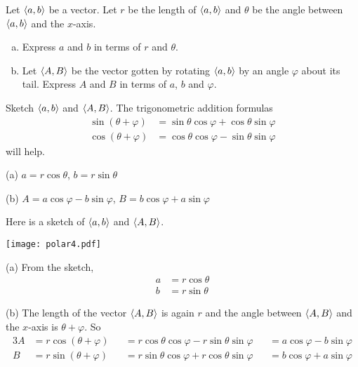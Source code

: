 \begin{question}
Let $\left< a, b\right>$ be a vector. Let $r$ be the length of $\left< a, b\right>$
and $\theta$ be the angle between $\left< a, b\right>$ and the $x$-axis.
\begin{enumerate}[(a)]
\item
Express $a$ and $b$ in terms of $r$ and $\theta$.
\item 
Let $\left< A, B\right>$ be the vector gotten by rotating $\left< a, b\right>$ 
by an angle $\varphi$ about its tail. Express $A$ and $B$ in terms of $a$, 
$b$ and $\varphi$.
\end{enumerate}
\end{question}

\begin{hint}
Sketch $\left< a, b\right>$ and $\left< A, B\right>$.
The trigonometric addition formulas 
\begin{align*}
\sin(\theta+\varphi)
       &=\sin\theta\cos\varphi+\cos\theta\sin\varphi \\
\cos(\theta+\varphi)
       &=\cos\theta\cos\varphi-\sin\theta\sin\varphi
\end{align*}
will help.
\end{hint}

\begin{answer}
(a) $a=r\cos\theta$, $b=r\sin\theta$

(b) $A=a\cos\varphi-b\sin\varphi$, 
    $B=b\cos\varphi+a\sin\varphi$
\end{answer}

\begin{solution}
Here is a sketch of $\left< a, b\right>$ and $\left< A, B\right>$.
\begin{center}
     \texttt{[image: polar4.pdf]}
\end{center}
(a) From the sketch,
\begin{align*}
a&=r\cos\theta\\
b&=r\sin\theta
\end{align*}

(b) The length of the vector $\left< A, B\right>$ is again $r$
and the angle between $\left< A, B\right>$ and the $x$-axis is $\theta
+\varphi$. So
\begin{alignat*}{3}
A&=r\cos(\theta+\varphi)
&&=r\cos\theta\cos\varphi-r\sin\theta\sin\varphi
&&=a\cos\varphi-b\sin\varphi\\
B&=r\sin(\theta+\varphi)
&&=r\sin\theta\cos\varphi+r\cos\theta\sin\varphi
&&=b\cos\varphi+a\sin\varphi
\end{alignat*}

\end{solution}

